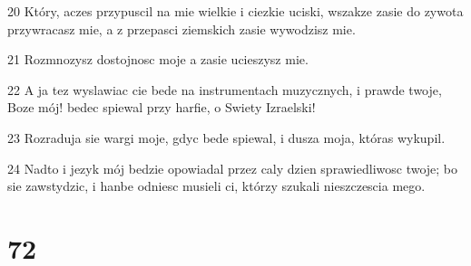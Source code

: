 \par 20 Który, aczes przypuscil na mie wielkie i ciezkie uciski, wszakze zasie do zywota przywracasz mie, a z przepasci ziemskich zasie wywodzisz mie.
\par 21 Rozmnozysz dostojnosc moje a zasie ucieszysz mie.
\par 22 A ja tez wyslawiac cie bede na instrumentach muzycznych, i prawde twoje, Boze mój! bedec spiewal przy harfie, o Swiety Izraelski!
\par 23 Rozraduja sie wargi moje, gdyc bede spiewal, i dusza moja, któras wykupil.
\par 24 Nadto i jezyk mój bedzie opowiadal przez caly dzien sprawiedliwosc twoje; bo sie zawstydzic, i hanbe odniesc musieli ci, którzy szukali nieszczescia mego.

\chapter{72}

